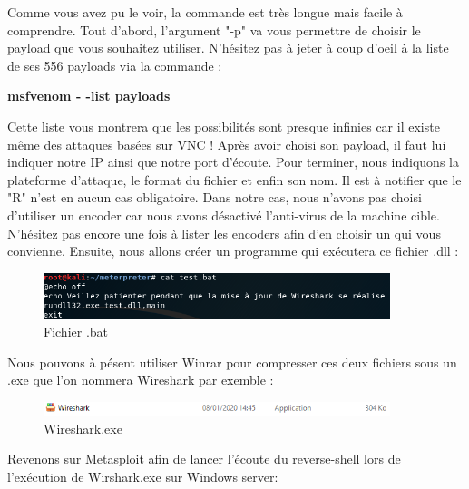 Comme vous avez pu le voir, la commande est très longue mais facile à comprendre. Tout d'abord, l'argument "-p" va vous permettre de choisir le payload que vous souhaitez utiliser. N'hésitez pas à jeter à coup d'oeil à la liste de ses 556 payloads via la commande :
\begin{center}
    \textbf{msfvenom  - -list payloads}
\end{center}
Cette liste vous montrera que les possibilités sont presque infinies car il existe même des attaques basées sur VNC ! Après avoir choisi son payload, il faut lui indiquer notre IP ainsi que notre port d'écoute. Pour terminer, nous indiquons la plateforme d'attaque, le format du fichier et enfin son nom. Il est à notifier que le "R" n'est en aucun cas obligatoire. Dans notre cas, nous n'avons pas choisi d'utiliser un encoder car nous avons désactivé l'anti-virus de la machine cible. N'hésitez pas encore une fois à lister les encoders afin d'en choisir un qui vous convienne.
Ensuite, nous allons créer un programme qui exécutera ce fichier .dll :

\begin{figure}[htp!]
  \centering
  \setlength\figureheight{7cm}
  \setlength\figurewidth{9cm}
  \includegraphics[width=0.9\textwidth]{oui/Ancien/imangeancien/meterpreter/bat.PNG}
  \caption{Fichier .bat}
  \label{fig:courbe-tikz}
\end{figure}

Nous pouvons à pésent utiliser Winrar pour compresser ces deux fichiers sous un .exe que l'on nommera Wireshark par exemble :

\begin{figure}[htp!]
  \centering
  \setlength\figureheight{7cm}
  \setlength\figurewidth{9cm}
  \includegraphics[width=0.9\textwidth]{oui/Ancien/imangeancien/meterpreter/wireshark.PNG}
  \caption{Wireshark.exe}
  \label{fig:courbe-tikz}
\end{figure}

\vspace{2cm}
Revenons sur Metasploit afin de lancer l'écoute du reverse-shell lors de l'exécution de Wirshark.exe sur Windows server:

